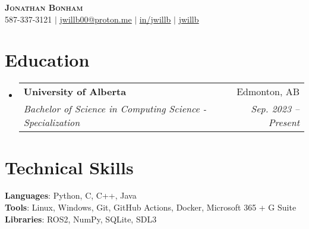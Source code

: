 \documentclass[letterpaper,11pt]{article}
\makeatletter
\newcommand{\resumeSubheading}[4]{
  \vspace{-2pt}\item
    \begin{tabular*}{0.97\textwidth}[t]{l@{\extracolsep{\fill}}r}
      \textbf{#1} & #2 \\
      \textit{\small#3} & \textit{\small #4} \\
    \end{tabular*}\vspace{-7pt}
}
\newcommand{\resumeSubHeadingListStart}{\begin{itemize}[leftmargin=0.15in, label={}]}
\newcommand{\resumeSubHeadingListEnd}{\end{itemize}}
\makeatother
\begin{document}

\begin{center}
    \textbf{\Huge \scshape Jonathan Bonham} \\ \vspace{1pt}
    \small \faPhone \hspace{0.5mm} 587-337-3121 $|$ \href{mailto:jwillb00@proton.me}{\faEnvelope \hspace{0.5mm} \underline{jwillb00@proton.me}} $|$ 
    \href{https://linkedin.com/in/jwillb}{\faLinkedinSquare \hspace{0.5mm} \underline{in/jwillb}} $|$
    \href{https://github.com/jwillb}{\faGithub \hspace{0.5mm} \underline{jwillb}}
\end{center}


\section{Education}
  \resumeSubHeadingListStart
    \resumeSubheading
      {University of Alberta}{Edmonton, AB}
      {Bachelor of Science in Computing Science - Specialization}{Sep. 2023 -- Present}
  \resumeSubHeadingListEnd

%
\section{Technical Skills}
 \begin{itemize}[leftmargin=0.15in, label={}]
    \small{\item{
     \textbf{Languages}{: Python, C, C++, Java} \\
     \textbf{Tools}{: Linux, Windows, Git, GitHub Actions, Docker, Microsoft 365 + G Suite} \\
     \textbf{Libraries}{: ROS2, NumPy, SQLite, SDL3}
    }}
 \end{itemize}




\end{document}
